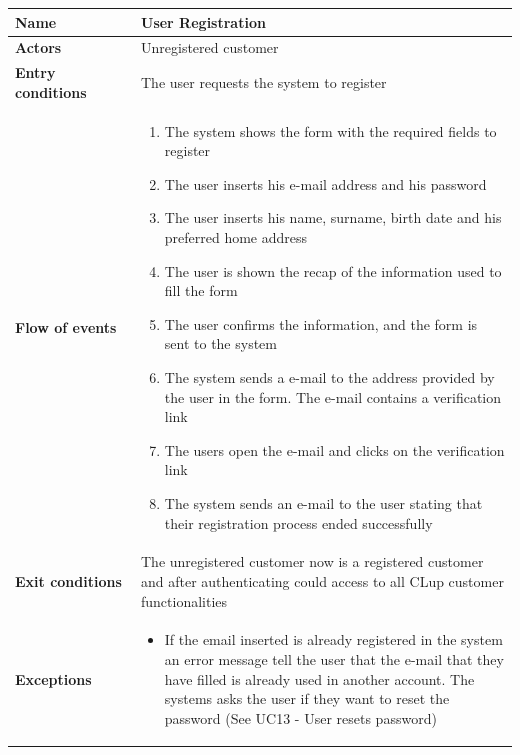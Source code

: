 \begin{longtable}{p{0.25\linewidth}p{0.75\linewidth}}
    \toprule
    \textbf{Name}             & \textbf{User Registration}                                                                                                        \\
    \midrule
    \textbf{Actors}           & Unregistered customer                                                                                                             \\
    \midrule
    \textbf{Entry conditions} & The user requests the system to register                                                                                          \\
    \midrule
    \textbf{Flow of events}   &
    \begin{enumerate}
        \item The system shows the form with the required fields to register
        \item The user inserts his e-mail address and his password
        \item The user inserts his name, surname, birth date and his preferred home address
        \item The user is shown the recap of the information used to fill the form
        \item The user confirms the information, and the form is sent to the system
        \item The system sends a e-mail to the address provided by the user in the form. The e-mail contains a verification link
        \item The users open the e-mail and clicks on the verification link
        \item The system sends an e-mail to the user stating that their registration process ended successfully
    \end{enumerate}                                                                                                                                     \\
    \midrule
    \textbf{Exit conditions}  & The unregistered customer now is a registered customer and after authenticating could access to all CLup customer functionalities \\
    \midrule
    \textbf{Exceptions}       &
    \begin{itemize}
        \item If the email inserted is already registered in the system an error message tell the user that the e-mail that they have filled is already used in another account. The systems asks the user if they want to reset the password (See UC13 - User resets password) %

\end{itemize}
\end{longtable}

